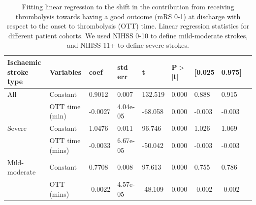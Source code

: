 \begin{table}[!ht]
    \caption{Fitting linear regression to the shift in the contribution from receiving thrombolysis towards having a good outcome (mRS 0-1) at discharge with respect to the onset to thrombolysis (OTT) time. Linear regression statistics for different patient cohorts. We used NIHSS 0-10 to define mild-moderate strokes, and NIHSS 11+ to define severe strokes.}
    \centering
        \begin{tabular}{lllllllll}
        \toprule
         Ischaemic stroke type & Variables & coef & std err & t & P$>$$|$t$|$ & [0.025 & 0.975] \\ 
         \midrule
        All & Constant & 0.9012 & 0.007 & 132.519 & 0.000 & 0.888 & 0.915\\
        & OTT time (min) &  -0.0027  & 4.04e-05 & -68.058 & 0.000 & -0.003 & -0.003\\   
        \midrule
        Severe & Constant & 1.0476  &    0.011  & 96.746 & 0.000 & 1.026 & 1.069\\
        & OTT time (mins) & -0.0033 &  6.67e-05  & -50.042 & 0.000 & -0.003 & -0.003\\ 
        \midrule
        Mild-moderate & Constant &           0.7708 &     0.008   & 97.613 & 0.000 & 0.755 & 0.786\\
        & OTT (mins) &  -0.0022 &   4.57e-05 & -48.109 & 0.000 & -0.002 & -0.002\\
        \bottomrule
        \end{tabular}
      \label{fig:stats_table_mrs1}
\end{table}

\FloatBarrier
